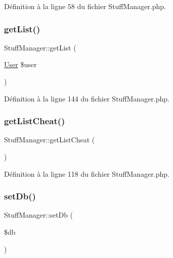 Définition à la ligne 58 du fichier Stuff\+Manager.\+php.

\mbox{\label{class_stuff_manager_a24643ff2a965eaf63cf467fb00107266}} 
\subsubsection{\texorpdfstring{get\+List()}{getList()}}
{\footnotesize\ttfamily Stuff\+Manager\+::get\+List (\begin{DoxyParamCaption}\item[{\mbox{\hyperlink{class_user}{User}}}]{\$user }\end{DoxyParamCaption})}



Définition à la ligne 144 du fichier Stuff\+Manager.\+php.

\mbox{\label{class_stuff_manager_aa9af4cbbb54d6df257b5c61c9204d4bf}} 
\subsubsection{\texorpdfstring{get\+List\+Cheat()}{getListCheat()}}
{\footnotesize\ttfamily Stuff\+Manager\+::get\+List\+Cheat (\begin{DoxyParamCaption}{ }\end{DoxyParamCaption})}



Définition à la ligne 118 du fichier Stuff\+Manager.\+php.

\mbox{\label{class_stuff_manager_a647de5fc08c6606300ca30937b7dde9e}} 
\subsubsection{\texorpdfstring{set\+Db()}{setDb()}}
{\footnotesize\ttfamily Stuff\+Manager\+::set\+Db (\begin{DoxyParamCaption}\item[{}]{\$db }\end{DoxyParamCaption})}



